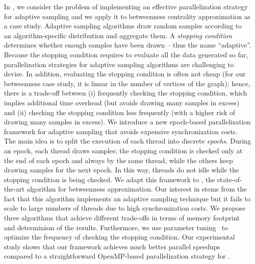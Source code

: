 In , we consider the problem of implementing an
effective parallelization strategy for adaptive sampling and we apply it to
betweenness centrality approximation as a case study.
Adaptive sampling algorithms draw random samples according to an
algorithm-specific distribution and aggregate them.
A \emph{stopping condition} determines whether enough samples have been drawn --
thus the name \enquote{adaptive}. Because the stopping condition requires to
evaluate all the data generated so far, parallelization strategies for
adaptive sampling algorithms are challenging to devise. In addition,
evaluating the stopping condition is often not cheap (\eg for our
betweenness case study, it is linear in the number of vertices of the graph);
hence, there is a trade-off between (i) frequently checking the stopping condition,
which implies additional time overhead (but avoids drawing many samples in
excess) and (ii) checking the stopping condition less frequently (with a
higher risk of drawing many samples in excess).
We introduce a new epoch-based parallelization framework for adaptive sampling
that avoids expensive synchronization costs. The main idea is to split the
execution of each thread into discrete \emph{epochs}. During an epoch, each
thread draws samples; the stopping condition is checked only at the end of
each epoch and always by the same thread, while the others keep drawing samples
for the next epoch. In this way, threads do not idle while the stopping
condition is being checked.
We adapt this framework to \kadabra, the state-of-the-art algorithm for
betweenness approximation. Our interest in \kadabra stems from the fact that
this algorithm implements an adaptive sampling technique but it fails to scale
to large numbers of threads due to high synchronization costs. We propose three
algorithms that achieve different trade-offs in terms of memory footprint and
determinism of the results. Furthermore, we use parameter
tuning~\cite{DBLP:journals/algorithms/AngrimanGLMNPT19} to optimize the
frequency of checking the stopping condition.
Our experimental study shows that our framework achieves much better parallel
speedups compared to a straightforward OpenMP-based parallelization strategy
for \kadabra.

